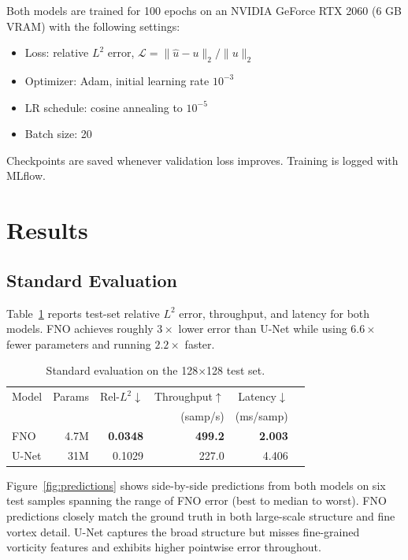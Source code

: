 \documentclass[11pt,twocolumn]{article}
\begin{document}
Both models are trained for 100 epochs on an NVIDIA GeForce RTX 2060 (6 GB
VRAM) with the following settings:
\begin{itemize}
  \item Loss: relative $L^2$ error,
        $\mathcal{L} = \|\hat{u} - u\|_2 / \|u\|_2$
  \item Optimizer: Adam, initial learning rate $10^{-3}$
  \item LR schedule: cosine annealing to $10^{-5}$
  \item Batch size: 20
\end{itemize}
Checkpoints are saved whenever validation loss improves.
Training is logged with MLflow.

\section{Results}
\label{sec:results}

\subsection{Standard Evaluation}

Table~\ref{tab:standard} reports test-set relative $L^2$ error, throughput, and
latency for both models.
FNO achieves roughly $3\times$ lower error than U-Net while using $6.6\times$
fewer parameters and running $2.2\times$ faster.

\begin{table}[H]
  \centering
  \caption{Standard evaluation on the 128$\times$128 test set.}
  \label{tab:standard}
  \begin{tabular}{lrrrrr}
    \toprule
    Model  & Params & Rel-$L^2$$\downarrow$ & Throughput$\uparrow$ & Latency$\downarrow$ \\
           &        &                        & (samp/s)              & (ms/samp) \\
    \midrule
    FNO    & 4.7M   & \textbf{0.0348}        & \textbf{499.2}        & \textbf{2.003} \\
    U-Net  & 31M    & 0.1029                 & 227.0                 & 4.406 \\
    \bottomrule
  \end{tabular}
\end{table}

Figure~\ref{fig:predictions} shows side-by-side predictions from both models
on six test samples spanning the range of FNO error (best to median to worst).
FNO predictions closely match the ground truth in both large-scale structure and
fine vortex detail.
U-Net captures the broad structure but misses fine-grained vorticity features
and exhibits higher pointwise error throughout.
\end{document}

